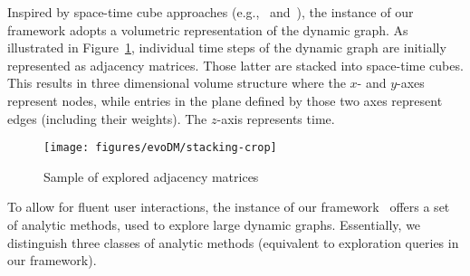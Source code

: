 Inspired by space-time cube approaches (e.g.,~\cite{bach:2017} and~\cite{Bach_CHI:14}), the instance of our framework adopts a volumetric representation of the dynamic graph.
As illustrated in Figure~\ref{fig:illu}, individual time steps of the dynamic graph are initially represented as adjacency matrices.
Those latter are stacked into space-time cubes.
This results in three dimensional volume structure where the $x$- and $y$-axes represent nodes, while entries in the plane defined by those two axes represent edges (including their weights). 
The $z$-axis represents time.

\begin{figure}
	\centering
	\texttt{[image: figures/evoDM/stacking-crop]}
	\caption{Sample of explored adjacency matrices~\cite{Bruder2019}}
	\label{fig:illu}
\end{figure}


To allow for fluent user interactions, the instance of our framework~\cite{Bruder2019} offers a set of analytic methods, used to explore large dynamic graphs.
Essentially, we distinguish three classes of analytic methods {\color{Fuchsia}(equivalent to exploration queries in our framework)}.

